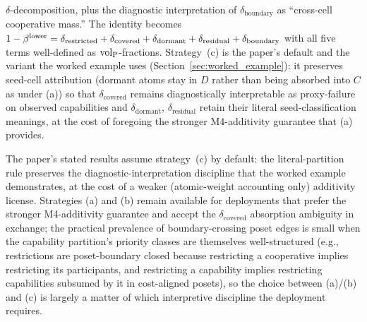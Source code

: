 \begin{remark}
\begin{enumerate}
  $\delta$-decomposition, plus the diagnostic interpretation
  of $\delta_{\mathrm{boundary}}$ as ``cross-cell cooperative
  mass.''  The identity becomes $1 - \beta^{\mathrm{lower}} =
  \delta_{\mathrm{restricted}} + \delta_{\mathrm{covered}} +
  \delta_{\mathrm{dormant}} + \delta_{\mathrm{residual}} +
  \delta_{\mathrm{boundary}}$ with all five terms well-defined
  as ${\operatorname{vol}_{\mathrm{P}}}$-fractions.  Strategy~(c) is the paper's default
  and the variant the worked example uses
  (Section~\ref{sec:worked_example}): it
  preserves seed-cell attribution (dormant atoms stay in $D$
  rather than being absorbed into $C$ as under (a)) so that
  $\delta_{\mathrm{covered}}$ remains diagnostically
  interpretable as proxy-failure on observed capabilities and
  $\delta_{\mathrm{dormant}}$, $\delta_{\mathrm{residual}}$
  retain their literal seed-classification meanings, at the
  cost of foregoing the stronger M4-additivity guarantee that
  (a) provides.
\end{enumerate}
The paper's stated results assume strategy~(c) by default: the
literal-partition rule preserves the diagnostic-interpretation
discipline that the worked example demonstrates, at the
cost of a weaker (atomic-weight accounting only) additivity
license.  Strategies (a)
and (b) remain available for deployments that prefer the
stronger M4-additivity guarantee and accept the
$\delta_{\mathrm{covered}}$ absorption ambiguity in exchange;
the practical prevalence of boundary-crossing poset edges is
small when the capability partition's priority classes are
themselves well-structured (e.g., restrictions are
poset-boundary closed because restricting a cooperative implies
restricting its participants, and restricting a capability
implies restricting capabilities subsumed by it in cost-aligned
posets), so the choice between (a)/(b) and (c) is largely a
matter of which interpretive discipline the deployment
requires.
\end{remark}

